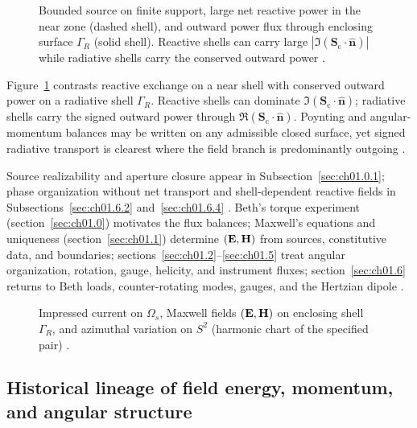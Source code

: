 \begin{figure}[t]
\centering
\VolIPhysFig{\VolIPhysReactiveVsRadiative}
\caption{Bounded source on finite support, large net reactive power in the near zone (dashed shell), and outward power flux through enclosing surface $\Gamma_R$ (solid shell). Reactive shells can carry large $|\Im(\mathbf{S}_\mathrm{c}\cdot\hat{\mathbf{n}})|$ while radiative shells carry the conserved outward power \cite{poynting1884,chu1948}.}
\label{fig:ch1.master-philosophy}
\end{figure}

Figure~\ref{fig:ch1.master-philosophy} contrasts reactive exchange on a near shell with conserved outward power on a radiative shell $\Gamma_R$. Reactive shells can dominate $\Im(\mathbf{S}_\mathrm{c}\cdot\hat{\mathbf{n}})$; radiative shells carry the signed outward power through $\Re(\mathbf{S}_\mathrm{c}\cdot\hat{\mathbf{n}})$. Poynting and angular-momentum balances may be written on any admissible closed surface, yet signed radiative transport is clearest where the field branch is predominantly outgoing \cite{chu1948,stratton1941}.

Source realizability and aperture closure appear in Subsection~\ref{sec:ch01.0.1}; phase organization without net transport and shell-dependent reactive fields in Subsections~\ref{sec:ch01.6.2} and~\ref{sec:ch01.6.4} \cite{stratton1941,harrington2001}. Beth's torque experiment (section~\ref{sec:ch01.0}) motivates the flux balances; Maxwell's equations and uniqueness (section~\ref{sec:ch01.1}) determine $(\mathbf{E},\mathbf{H})$ from sources, constitutive data, and boundaries; sections~\ref{sec:ch01.2}--\ref{sec:ch01.5} treat angular organization, rotation, gauge, helicity, and instrument fluxes; section~\ref{sec:ch01.6} returns to Beth loads, counter-rotating modes, gauges, and the Hertzian dipole \cite{beth1936,stratton1941,harrington2001}.
\label{thm:ch1.realizability-hierarchy}\label{prin:ch1.rep-physics}\label{def:ch1.hierarchy-classes}\label{hier:ch1.angular-status}\label{prin:ch1.finite-geometry-angular}\label{prin:ch1.accessibility}

\begin{figure}[t]
\centering
\VolIPhysFig{\VolIPhysThreeLevelHierarchy}
\caption{Impressed current on $\Omega_s$, Maxwell fields $(\mathbf{E},\mathbf{H})$ on enclosing shell $\Gamma_R$, and azimuthal variation on $S^2$ (harmonic chart of the specified pair) \cite{stratton1941}.}
\label{fig:ch1.three-level-hierarchy}
\end{figure}

\subsection{Historical lineage of field energy, momentum, and angular structure}
\label{sec:ch01.0.historical-lineage}

